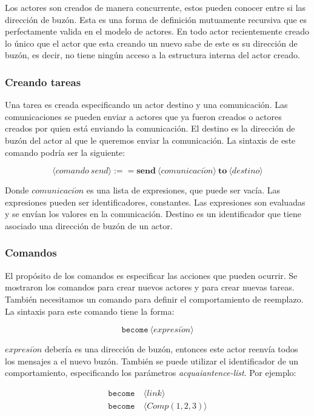 Los actores son creados de manera concurrente, estos pueden conocer entre si las dirección de buzón. Esta es una forma de definición mutuamente recursiva que es perfectamente valida en el modelo de actores. En todo actor recientemente creado lo único que el actor que esta creando un nuevo sabe de este es su dirección de buzón, es decir, no tiene ningún acceso a la estructura interna del actor creado.

\subsubsection*{Creando tareas}

Una tarea es creada especificando un actor destino y una comunicación. Las comunicaciones se pueden enviar a actores que ya fueron creados o actores creados por quien está enviando la comunicación. El destino es la dirección de buzón del actor al que le queremos enviar la comunicación. La sintaxis de este comando podría ser la siguiente:

\[
  \langle comando\ send \rangle :== \textbf{send}\ \langle comunicaci\acute{o}n \rangle\ \textbf{to}\ \langle destino \rangle
\]

Donde $comunicaci\acute{o}n$ es una lista de expresiones, que puede ser vacía. Las expresiones pueden ser identificadores, constantes. Las expresiones son evaluadas y se envían los valores en la comunicación. Destino es un identificador que tiene asociado una dirección de buzón de un actor.

\subsubsection*{Comandos}

El propósito de los comandos es especificar las acciones que pueden ocurrir. Se mostraron los comandos para crear nuevos actores y para crear nuevas tareas. También necesitamos un comando para definir el comportamiento de reemplazo. La sintaxis para este comando tiene la forma:

\[
 \texttt{become}\ \langle expresi\acute{o}n \rangle
\]

$expresi\acute{o}n$ debería es una dirección de buzón, entonces este actor reenvía todos los mensajes a el nuevo buzón. También se puede utilizar el identificador de un comportamiento, especificando los parámetros \textit{acquaiantence-list}. Por ejemplo:

\begin{align*}
 \texttt{become}&\ \langle link \rangle \\
 \texttt{become}&\ \langle Comp(1,2,3) \rangle
\end{align*}

